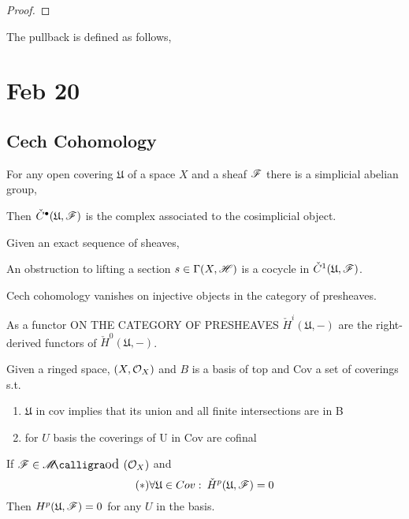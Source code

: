 \documentclass[12pt]{article}
\begin{document}
\begin{proof}

\end{proof}

\begin{rmk}
The pullback is defined as follows, 
\end{rmk}

\section{Feb 20}

\subsection{Cech Cohomology}

\renewcommand{\U}{\mathfrak{U}}

For any open covering $\U$ of a space $X$ and a sheaf $\mathscr{F}$ there is a simplicial abelian group,
\begin{center}
\end{center}
Then $\check{C}^\bullet(\U, \F)$ is the complex associated to the cosimplicial object. 


\begin{ex}
Given an exact sequence of sheaves,
\begin{center}
\end{center}
An obstruction to lifting a section $s \in \Gamma(X, \mathscr{H})$ is a cocycle in $\check{C}^1(\U, \F)$. 
\end{ex}

\begin{lemma}
Cech cohomology vanishes on injective objects in the category of presheaves.
\end{lemma}

\begin{corollary}
As a functor ON THE CATEGORY OF PRESHEAVES $\check{H}^i(\U, -)$ are the right-derived functors of $\check{H}^0(\U, -)$.
\end{corollary}

\begin{lemma}
Given a ringed space, $(X, \mathcal{O}_{X})$ and $B$ is a basis of top and Cov a set of coverings s.t.
\begin{enumerate}
\item $\U$ in cov implies that its union and all finite intersections are in B
\item for $U$ basis the coverings of U in Cov are cofinal 
\end{enumerate}
If $\F \in \shMod{\struct{X}}$ and
\[ (*) \forall \U \in Cov : \: \check{H}^p(\U, \F) = 0 \]
Then $H^p(\U, \F) = 0$ for any $U$ in the basis. 
\end{lemma}
\end{document}
